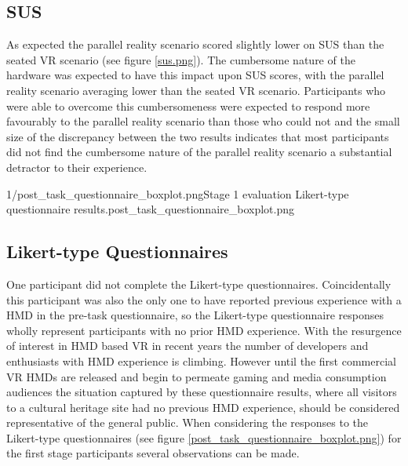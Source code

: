 
\subsection{SUS}
As expected the parallel reality scenario scored slightly lower on SUS than the seated VR scenario (see figure \ref{sus.png}). The cumbersome nature of the hardware was expected to have this impact upon SUS scores, with the parallel reality scenario averaging lower than the seated VR scenario. Participants who were able to overcome this cumbersomeness were expected to respond more favourably to the parallel reality scenario than those who could not and the small size of the discrepancy between the two results indicates that most participants did not find the cumbersome nature of the parallel reality scenario a substantial detractor to their experience.

       {1/post_task_questionnaire_boxplot.png}{Stage 1 evaluation Likert-type questionnaire results.}{post_task_questionnaire_boxplot.png}


\subsection{Likert-type Questionnaires}

One participant did not complete the Likert-type questionnaires. Coincidentally this participant was also the only one to have reported previous experience with a HMD in the pre-task questionnaire, so the Likert-type questionnaire responses wholly represent participants with no prior HMD experience. With the resurgence of interest in HMD based VR in recent years the number of developers and enthusiasts with HMD experience is climbing. However until the first commercial VR HMDs are released and begin to permeate gaming and media consumption audiences the situation captured by these questionnaire results, where all visitors to a cultural heritage site had no previous HMD experience, should be considered representative of the general public. When considering the responses to the Likert-type questionnaires (see figure \ref{post_task_questionnaire_boxplot.png}) for the first stage participants several observations can be made.

